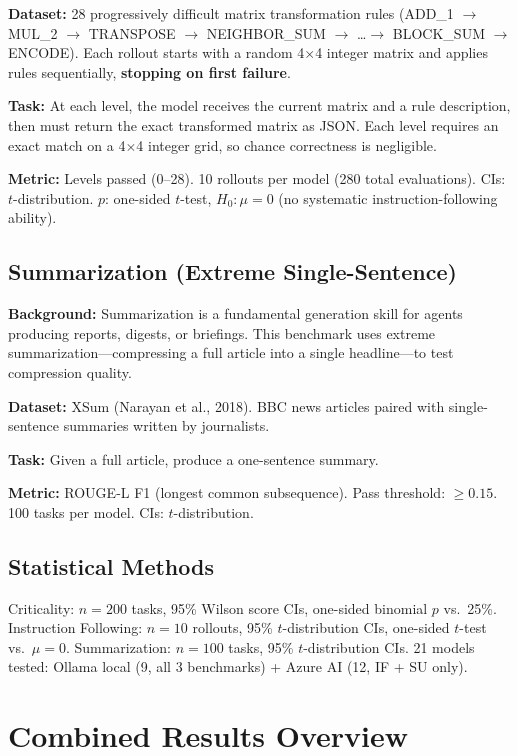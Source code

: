 \documentclass[11pt,a4paper]{article}
\begin{document}
\textbf{Dataset:} 28 progressively difficult matrix transformation rules (ADD\_1 $\to$ MUL\_2 $\to$ TRANSPOSE $\to$ NEIGHBOR\_SUM $\to$ \ldots $\to$ BLOCK\_SUM $\to$ ENCODE). Each rollout starts with a random 4$\times$4 integer matrix and applies rules sequentially, \textbf{stopping on first failure}.

\textbf{Task:} At each level, the model receives the current matrix and a rule description, then must return the exact transformed matrix as JSON. Each level requires an exact match on a 4$\times$4 integer grid, so chance correctness is negligible.

\textbf{Metric:} Levels passed (0--28). 10 rollouts per model (280 total evaluations). CIs: $t$-distribution. $p$: one-sided $t$-test, $H_0\!: \mu = 0$ (no systematic instruction-following ability).

\subsection{Summarization (Extreme Single-Sentence)}

\textbf{Background:} Summarization is a fundamental generation skill for agents producing reports, digests, or briefings. This benchmark uses extreme summarization---compressing a full article into a single headline---to test compression quality.

\textbf{Dataset:} XSum (Narayan et al., 2018). BBC news articles paired with single-sentence summaries written by journalists.

\textbf{Task:} Given a full article, produce a one-sentence summary.

\textbf{Metric:} ROUGE-L F1 (longest common subsequence). Pass threshold: $\geq 0.15$. 100 tasks per model. CIs: $t$-distribution.

\subsection{Statistical Methods}

Criticality: $n = 200$ tasks, 95\% Wilson score CIs, one-sided binomial $p$ vs.\ 25\%. Instruction Following: $n = 10$ rollouts, 95\% $t$-distribution CIs, one-sided $t$-test vs.\ $\mu = 0$. Summarization: $n = 100$ tasks, 95\% $t$-distribution CIs. 21 models tested: Ollama local (9, all 3 benchmarks) + Azure AI (12, IF + SU only).

\section{Combined Results Overview}
\end{document}
